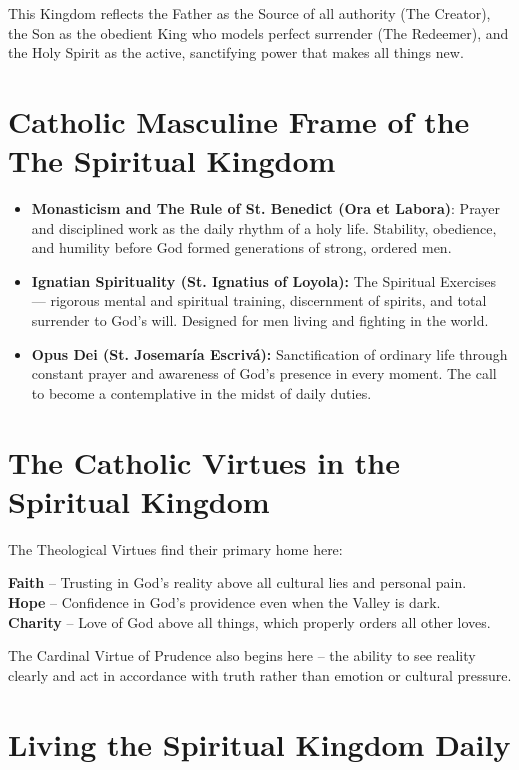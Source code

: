 \documentclass[12pt,a4paper]{book}
\begin{document}
This Kingdom reflects the Father as the Source of all authority (The Creator), the Son as the obedient King who models perfect surrender (The Redeemer), and the Holy Spirit as the active, sanctifying power that makes all things new.

\section{Catholic Masculine Frame of the The Spiritual Kingdom}

\begin{itemize}

\item \textbf{Monasticism and The Rule of St. Benedict (Ora et Labora)}: Prayer and disciplined work as the daily rhythm of a holy life. Stability, obedience, and humility before God formed generations of strong, ordered men.

\item \textbf{Ignatian Spirituality (St. Ignatius of Loyola):} The Spiritual Exercises — rigorous mental and spiritual training, discernment of spirits, and total surrender to God’s will. Designed for men living and fighting in the world.

\item \textbf{Opus Dei (St. Josemaría Escrivá):} Sanctification of ordinary life through constant prayer and awareness of God’s presence in every moment. The call to become a contemplative in the midst of daily duties.
\end{itemize}

\section{The Catholic Virtues in the Spiritual Kingdom}

The Theological Virtues find their primary home here:

\textbf{Faith} -- Trusting in God’s reality above all cultural lies and personal pain. \\
\textbf{Hope} -- Confidence in God’s providence even when the Valley is dark.\\
\textbf{Charity} -- Love of God above all things, which properly orders all other loves.

The Cardinal Virtue of Prudence also begins here -- the ability to see reality clearly and act in accordance with truth rather than emotion or cultural pressure.

\section{Living the Spiritual Kingdom Daily}
\end{document}
